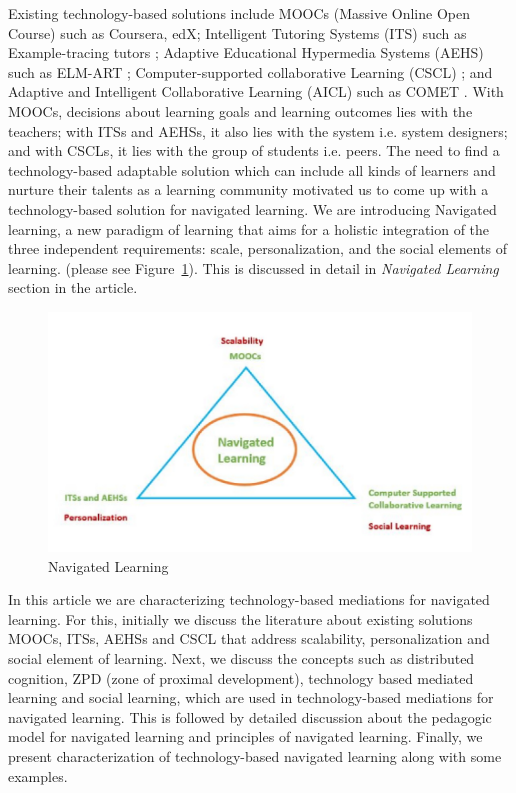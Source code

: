 \begin{multicols}{2}
Existing technology-based solutions include MOOCs (Massive Online Open Course) \cite{art2-key08} such as Coursera, edX; Intelligent Tutoring Systems (ITS) such as Example-tracing tutors \cite{art2-key04}; Adaptive Educational Hypermedia Systems (AEHS) such as ELM-ART \cite{art2-key09}; Computer-supported collaborative Learning (CSCL) \cite{art2-key22, art2-key34}; and Adaptive and Intelligent Collaborative Learning (AICL) \cite{art2-key35} such as COMET \cite{art2-key49}. With MOOCs, decisions about learning goals and learning outcomes lies with the teachers; with ITSs and AEHSs, it also lies with the system i.e. system  designers; and with CSCLs, it lies with the group of students i.e. peers. The need to find a technology-based adaptable solution which can include all kinds of learners and nurture their talents as a learning community motivated us to come up with a technology-based solution for navigated learning. We are introducing Navigated learning, a new paradigm of learning that aims for a holistic integration of the three independent requirements: scale, personalization, and the social elements of learning. (please see Figure~\ref{chap2-fig01}). This is discussed in detail in \textit{Navigated Learning} section in the article.
\setcounter{figure}{0}
\begin{figure}[H]
\centering
\includegraphics[scale=1.05]{src/Figures/chap2/chap2-fig01.jpg}
\caption{Navigated Learning}\label{chap2-fig01}
\end{figure}

In this article we are characterizing technology-based mediations for navigated learning. For this, initially we discuss the literature about existing solutions MOOCs, ITSs, AEHSs and CSCL that address scalability, personalization and social element of learning. Next, we discuss the concepts such as distributed cognition, ZPD (zone of proximal development), technology based mediated learning and social learning, which are used in technology-based mediations for navigated learning. This is followed by detailed discussion about the pedagogic model for navigated learning and principles of navigated learning. Finally, we present characterization of technology-based navigated learning along with some examples.


\end{multicols}
